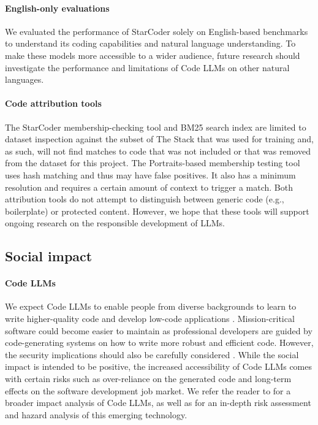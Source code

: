 \documentclass[10pt]{article} %
\begin{document}

\paragraph{English-only evaluations} We evaluated the performance of StarCoder solely on English-based benchmarks to understand its coding capabilities and natural language understanding. To make these models more accessible to a wider audience, future research should investigate the performance and limitations of Code LLMs on other natural languages. 

\paragraph{Code attribution tools} The StarCoder membership-checking tool and BM25 search index are limited to dataset inspection against the subset of The Stack that was used for training and, as such, will not find matches to code that was not included or that was removed from the dataset for this project. The Portraits-based membership testing tool uses hash matching and thus may have false positives. It also has a minimum resolution and requires a certain amount of context to trigger a match. 
Both attribution tools do not attempt to distinguish between generic code (e.g., boilerplate) or protected content. However, we hope that these tools will support ongoing research on the responsible development of LLMs.


\subsection{Social impact}

\paragraph{Code LLMs} We expect Code LLMs to enable people from diverse backgrounds to learn to write higher-quality code and develop
low-code applications \citep{leinonen2023comparing}. Mission-critical software could become easier to maintain as professional developers are guided by code-generating systems on how to write more robust and efficient code. However, the security implications should also be carefully considered \citep{sandoval2023lost}. While the social impact is intended to be positive, the increased accessibility of Code LLMs comes with certain risks such as over-reliance on the generated code and long-term effects on the software development job market. We refer the reader to \citet[Section 7]{chen2021codex} for a broader impact analysis of Code LLMs, as well as \citet{khlaaf2022hazard} for an in-depth risk assessment and hazard analysis of this emerging technology.
\end{document}

